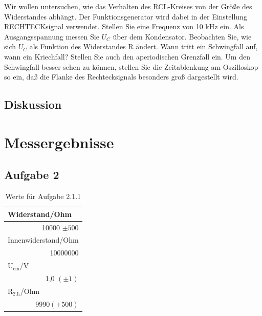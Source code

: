 \documentclass[12pt]{scrartcl}
\begin{document}
Wir wollen untersuchen, wie das Verhalten des RCL-Kreises von der Größe des Widerstandes abhängt. Der Funktionsgenerator wird dabei in der Einstellung RECHTECKsignal verwendet. Stellen Sie eine Frequenz von 10 kHz ein. Als Ausgangsspannung messen Sie
$U_C$ über dem Kondensator. Beobachten Sie, wie sich $U_C$
als Funktion des Widerstandes
R ändert. Wann tritt ein Schwingfall auf, wann ein Kriechfall? Stellen Sie auch den
aperiodischen Grenzfall ein. Um den Schwingfall besser sehen zu können, stellen Sie die Zeitablenkung am Oszilloskop so ein, daß die Flanke des Rechtecksignals besonders groß dargestellt wird.
\subsection{Diskussion}
 
\section{Messergebnisse}

\subsection{Aufgabe 2}

\begin{table}[htbp]
\caption{Werte für Aufgabe 2.1.1}
\begin{center}
\begin{tabular}{|l|}
\hline
Widerstand/Ohm \\ \hline
\multicolumn{1}{|r|}{10000 $\pm 500$} \\ \hline
Innenwiderstand/Ohm \\ \hline
\multicolumn{1}{|r|}{10000000} \\ \hline
U$_\text{ein}$/V  \\ \hline
\multicolumn{1}{|r|}{1,0 $(\pm 1)$} \\ \hline
R$_\text{2,L}$/Ohm \\ \hline
\multicolumn{1}{|r|}{9990$(\pm 500)$} \\ \hline
\end{tabular}
\end{center}
\label{tab:2.2.1}
\end{table}
\end{document}
